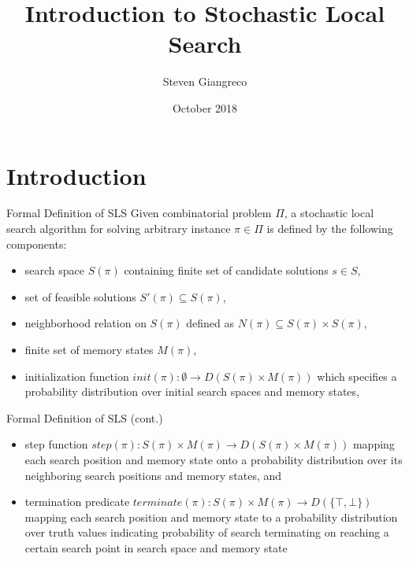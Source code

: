 \documentclass{beamer}
\title{Introduction to Stochastic Local Search}
\author{Steven Giangreco}
\date{October 2018}
\begin{document}
\maketitle

\section{Introduction}

\begin{frame}{Formal Definition of SLS}
Given combinatorial problem $\Pi$, a stochastic local search algorithm for solving arbitrary instance $\pi \in \Pi$ is defined by the following components:
\begin{itemize}
    \item search space $S(\pi)$ containing finite set of candidate solutions $s \in S$,
    \item set of feasible solutions $S'(\pi) \subseteq S(\pi)$,
    \item neighborhood relation on $S(\pi)$ defined as $N(\pi) \subseteq S(\pi) \times S(\pi)$,
    \item finite set of memory states $M(\pi)$,
    \item initialization function $init(\pi): \emptyset \rightarrow D(S(\pi) \times M(\pi))$ which specifies a probability distribution over initial search spaces and memory states,
\end{itemize}
    
\end{frame}

\begin{frame}{Formal Definition of SLS (cont.)}
\begin{itemize}
    \item step function $step(\pi): S(\pi) \times M(\pi) \rightarrow D(S(\pi) \times M(\pi))$ mapping each search position and memory state onto a probability distribution over its neighboring search positions and memory states, and
    \item termination predicate $terminate(\pi): S(\pi) \times M(\pi) \rightarrow D(\{\top, \bot\})$ mapping each search position and memory state to a probability distribution over truth values indicating probability of search terminating on reaching a certain search point in search space and memory state
\end{itemize}
\end{frame}
\end{document}
